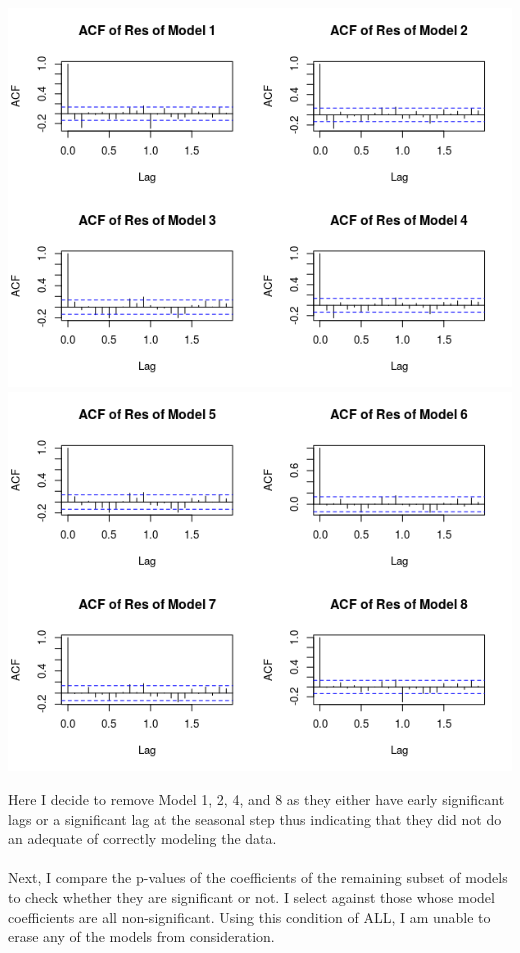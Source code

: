 \documentclass[11pt]{article}
\begin{document}
\begin{center}
\includegraphics[scale=1.2]{1e1}
\includegraphics[scale=1.2]{1e2}
\end{center}
Here I decide to remove Model 1, 2, 4, and 8 as they either have early significant lags or a significant lag at the seasonal step thus indicating that they did not do an adequate of correctly modeling the data. 
\\\\
Next, I compare the p-values of the coefficients of the remaining subset of models to check whether they are significant or not. I select against those whose model coefficients are all non-significant. Using this condition of ALL, I am unable to erase any of the models from consideration.
\end{document}

